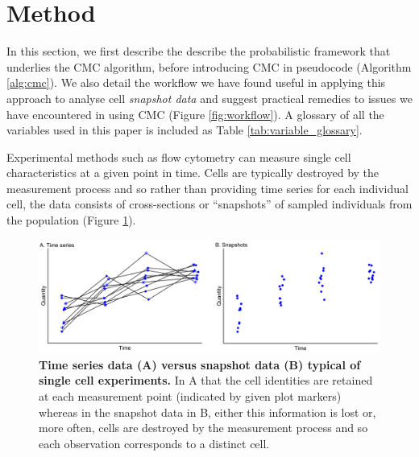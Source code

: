 \section{Method}\label{sec:method}
In this section, we first describe the describe the probabilistic framework that underlies the CMC algorithm, before introducing CMC in pseudocode (Algorithm \ref{alg:cmc}). We also detail the workflow we have found useful in applying this approach to analyse cell \emph{snapshot data} and suggest practical remedies to issues we have encountered in using CMC (Figure \ref{fig:workflow}). A glossary of all the variables used in this paper is included as Table \ref{tab:variable_glossary}.

Experimental methods such as flow cytometry can measure single cell characteristics at a given point in time. Cells are typically destroyed by the measurement process and so rather than providing time series for each individual cell, the data consists of cross-sections or ``snapshots'' of sampled individuals from the population (Figure \ref{fig:time_series_v_snapshots}).

\begin{figure}[H]
	\centerline{\includegraphics[width=\textwidth]{../figures/time_series_v_snapshots.pdf}}
	\caption{\textbf{Time series data (A) versus snapshot data (B) typical of single cell experiments.} In A that the cell identities are retained at each measurement point (indicated by given plot markers) whereas in the snapshot data in B, either this information is lost or, more often, cells are destroyed by the measurement process and so each observation corresponds to a distinct cell.}
	\label{fig:time_series_v_snapshots}
\end{figure}

